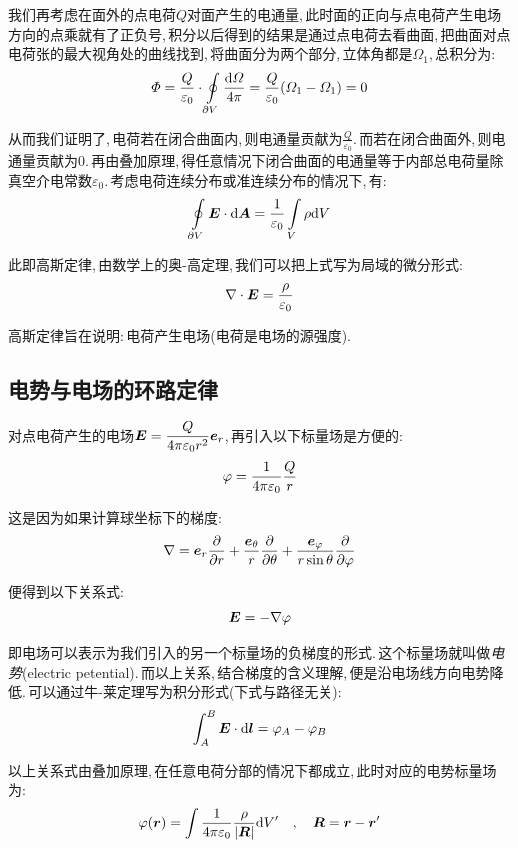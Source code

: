 我们再考虑在面外的点电荷$Q$对面产生的电通量,\,此时面的正向与点电荷产生电场方向的点乘就有了正负号,\,积分以后得到的结果是通过点电荷去看曲面,\,把曲面对点电荷张的最大视角处的曲线找到,\,将曲面分为两个部分,\,立体角都是$\varOmega_1$,\,总积分为:
\[\varPhi=\frac{Q}{\varepsilon_0}\cdot\oint\limits_{\partial V}\frac{\textrm{d}\varOmega}{4\pi}=\frac{Q}{\varepsilon_0}(\varOmega_1-\varOmega_1)=0\]

从而我们证明了,\,电荷若在闭合曲面内,\,则电通量贡献为\(\frac{Q}{\varepsilon_0}\).\,而若在闭合曲面外,\,则电通量贡献为$0$.\,再由叠加原理,\,得任意情况下闭合曲面的电通量等于内部总电荷量除真空介电常数$\varepsilon_0$.\,考虑电荷连续分布或准连续分布的情况下,\,有:
\[\oint\limits_{\partial V} \boldsymbol{E}\cdot\textrm{d} \boldsymbol{A}=\frac{1}{\varepsilon_0}\int\limits_V \rho\textrm{d} V\]

此即高斯定律,\,由数学上的奥-高定理,\,我们可以把上式写为局域的微分形式:
\[\nabla\cdot\boldsymbol{E}=\frac{\rho}{\varepsilon_0}\]

高斯定律旨在说明:\,电荷产生电场(电荷是电场的源强度).

\subsection{电势与电场的环路定律}

对点电荷产生的电场$\boldsymbol{E}=\dfrac{Q}{4\pi\varepsilon_0 r^2}\boldsymbol{e}_r$,\,再引入以下标量场是方便的:
\[\varphi=\frac{1}{4\pi\varepsilon_0}\frac{Q}{r}\]

这是因为如果计算球坐标下的梯度:
\[\nabla=\boldsymbol{e}_r\frac{\partial}{\partial r}+\frac{\boldsymbol{e}_\theta}{r}\frac{\partial}{\partial \theta}+\frac{\boldsymbol{e}_\varphi}{r\sin\theta}\frac{\partial}{\partial \varphi}\]

便得到以下关系式:
\[\boldsymbol{E}=-\nabla\varphi\]

即电场可以表示为我们引入的另一个标量场的负梯度的形式.\,这个标量场就叫做\emph{电势}(electric petential).\,而以上关系,\,结合梯度的含义理解,\,便是沿电场线方向电势降低.\,可以通过牛-莱定理写为积分形式(下式与路径无关):
\[\int_A^B \boldsymbol{E}\cdot \textrm{d}\boldsymbol{l}=\varphi_A-\varphi_B\]

以上关系式由叠加原理,\,在任意电荷分部的情况下都成立,\,此时对应的电势标量场为:
\[\varphi(\boldsymbol{r})=\int \frac{1}{4\pi\varepsilon_0}\frac{\rho}{|\boldsymbol{R}|}\textrm{d} V'\quad ,\quad \boldsymbol{R}=\boldsymbol{r}-\boldsymbol{r}'\]


